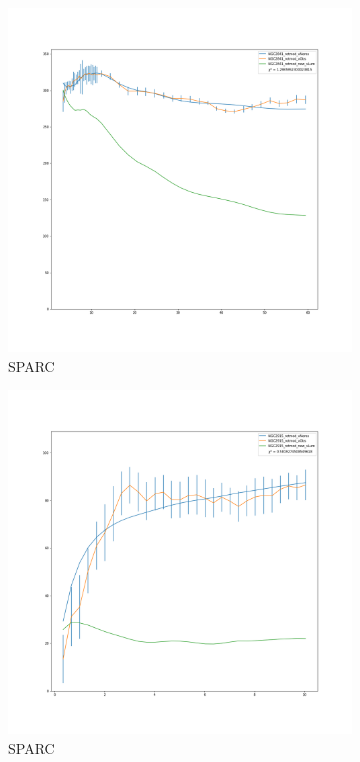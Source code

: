 \documentclass[reprint,%
 amsmath,amssymb,
 aps,
]{revtex4-1}
\begin{document}
  \begin{figure}[h]
\begin{subfigure}{.5\textwidth}
  \centering
  \includegraphics[width=.8\linewidth]{figures/NGC2841_rotmod_XueSofue.png}
  \caption{SPARC\cite{2016Lelli}}
  \label{fig:sfig17}
\end{subfigure}%
\begin{subfigure}{.5\textwidth}
  \centering
  \includegraphics[width=.8\linewidth]{figures/NGC2915_rotmod_XueSofue.png}
  \caption{SPARC\cite{2016Lelli}}
  \label{fig:sfig18}
\end{subfigure}
\caption{ }
\label{fig:fig2915}
\end{figure}
\end{document}
